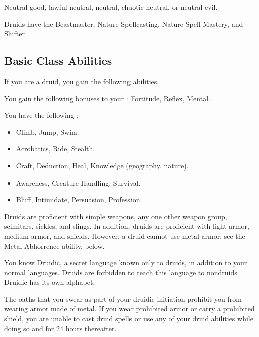      Neutral good, lawful neutral, neutral, chaotic neutral, or neutral evil.

     Druids have the Beastmaster, Nature Spellcasting, Nature Spell Mastery, and Shifter .

    \subsection{Basic Class Abilities}
        If you are a druid, you gain the following abilities.

        You gain the following bonuses to your :  Fortitude,  Reflex,  Mental.

        You have the following :
        \begin{itemize}
            \item {} Climb, Jump, Swim.
            \item {} Acrobatics, Ride, Stealth.
            \item {} Craft, Deduction, Heal, Knowledge (geography, nature).
            \item {} Awareness, Creature Handling, Survival.
            \item {} Bluff, Intimidate, Persuasion, Profession.
        \end{itemize}

        Druids are proficient with simple weapons, any one other weapon group, scimitars, sickles, and slings.
        In addition, druids are proficient with light armor, medium armor, and shields.
        However, a druid cannot use metal armor; see the Metal Abhorrence ability, below.

        You know Druidic, a secret language known only to druids, in addition to your normal languages.
        Druids are forbidden to teach this language to nondruids.
        Druidic has its own alphabet.

        The oaths that you swear as part of your druidic initiation prohibit you from wearing armor made of metal.
        If you wear prohibited armor or carry a prohibited shield, you are unable to cast druid spells or use any of your  druid abilities while doing so and for 24 hours thereafter.

